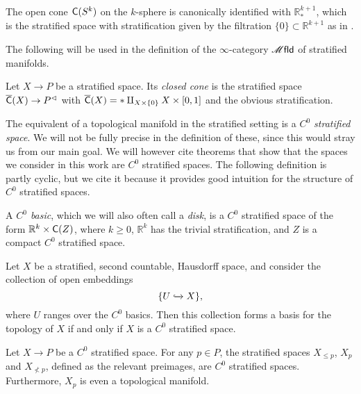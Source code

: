 \documentclass[../text]{subfiles}
\begin{document}
\begin{example}
    The open cone $\cone(S^k)$ on the $k$-sphere is canonically identified with $\mathbb{R}^{k+1}_*$, which is the stratified space with stratification given by the filtration $\{0\}\subset\mathbb{R}^{k+1}$ as in .
\end{example}

The following will be used in the definition of the $\infty$-category $\mfld$ of stratified manifolds.

\begin{definition}
    Let $X \to P$ be a stratified space. Its \emph{closed cone} is the stratified space $\cone[b](X) \to P^{\vartriangleleft}$ with $\cone[b](X) = \ast\amalg_{X \times \{0\}} X \times [0,1]$ and the obvious stratification.
\end{definition}

The equivalent of a topological manifold in the stratified setting is a \emph{$C^0$ stratified space}. We will not be fully precise in the definition of these, since this would stray us from our main goal. We will however cite theorems that show that the spaces we consider in this work are $C^0$ stratified spaces. The following definition is partly cyclic, but we cite it because it provides good intuition for the structure of $C^0$ stratified spaces.

\begin{definition}
    A \emph{$C^0$ basic}, which we will also often call a \emph{disk}, is a $C^0$ stratified space of the form $\mathbb{R}^k \times \cone(Z)$, where $k \geq 0$, $\mathbb{R}^k$ has the trivial stratification, and $Z$ is a compact $C^0$ stratified space.
\end{definition}

\begin{theorem}\label{thm:basics_give_basis}
    Let $X$ be a stratified, second countable, Hausdorff space, and consider the collection of open embeddings
    \begin{equation}
        \{ U \xhookrightarrow{} X\},
    \end{equation}
    where $U$ ranges over the $C^0$ basics. Then this collection forms a basis for the topology of $X$ if and only if $X$ is a $C^0$ stratified space.
\end{theorem}

\begin{theorem}
    Let $X \rightarrow P$ be a $C^0$ stratified space. For any $p \in P$, the stratified spaces $X_{\leq p}$, $X_{p}$ and $X_{\nless p}$, defined as the relevant preimages, are $C^0$ stratified spaces. Furthermore, $X_p$ is even a topological manifold.
\end{theorem}
\end{document}
